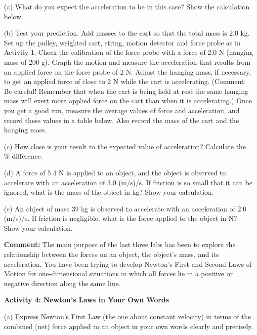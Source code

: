 (a) What do you expect the acceleration to be in this case? Show the calculation
below.
\vspace{20mm}

(b) Test your prediction. Add masses to the cart so that the total mass is 2.0
kg. Set up the pulley, weighted cart, string, motion detector and force probe
as in Activity 1. Check the calibration of the force probe with a force of 2.0
N (hanging mass of 200 g). Graph the motion and measure the acceleration that
results from an applied force on the force probe of 2 N. Adjust the hanging
mass, if necessary, to get an applied force of close to 2 N while the cart is
accelerating. (Comment: Be careful! Remember that when the cart is being held
at rest the same hanging mass will exert more applied force on the cart than
when it is accelerating.) Once you get a good run, measure the average values
of force and acceleration, and record these values in a table below. Also record
the mass of the cart and the hanging mass.
\vspace{30mm}

(c) How close is your result to the expected value of acceleration? Calculate
the \% difference.
\vspace{20mm}

(d) A force of 5.4 N is applied to an object, and the object is observed to
accelerate with an acceleration of 3.0 (m/s)/s. If friction is so small that it
can be ignored, what is the mass of the object in kg? Show your calculation.
\vspace{20mm}

(e) An object of mass 39 kg is observed to accelerate with an acceleration of
2.0 (m/s)/s. If friction is negligible, what is the force applied to the object
in N? Show your calculation.
\vspace{20mm}

\textbf{Comment:} The main purpose of the last three labs has been to explore
the relationship between the forces on an object, the object's mass, and its
acceleration. You have been trying to develop Newton's First and Second Laws
of Motion for one-dimensional situations in which all forces lie in a positive
or negative direction along the same line. 

\pagebreak[2]
\textbf{Activity 4: Newton's Laws in Your Own Words} 

(a) Express Newton's First Law (the one about constant velocity) in terms of
the combined (net) force applied to an object in your own words clearly and
precisely.
\vspace{20mm}

